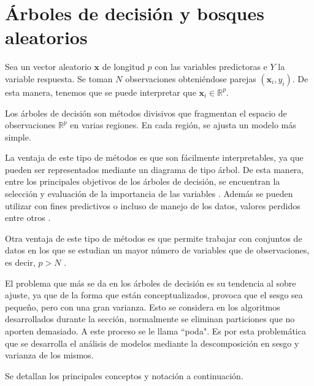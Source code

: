 \newpage
\section{ Árboles de decisión y bosques aleatorios}

\noindent Sea un vector aleatorio $\textbf{x}$ de longitud $p$ con las variables predictoras e $Y$ la variable respuesta. Se toman $N$ observaciones obteniéndose parejas $(\textbf{x}_i,y_i)$. De esta manera, tenemos que se puede interpretar que $\mathbf{x}_i\in\mathbb{R}^p$.

\noindent Los árboles de decisión son métodos divisivos que fragmentan  el espacio de observaciones $\mathbb{R}^p$ en varias regiones. En cada región, se ajusta un modelo más simple.

\noindent La ventaja de este tipo de métodos es que son fácilmente interpretables, ya que pueden ser representados mediante un diagrama de tipo árbol. De esta manera, entre los principales objetivos de los árboles de decisión, se encuentran la selección y evaluación de la importancia de las variables \cite{Brown 2004,Song 2015}. Además se pueden utilizar con fines predictivos o incluso de manejo de los datos, valores perdidos entre otros \cite{Nerini 2007}.

\noindent Otra ventaja de este tipo de métodos es que permite trabajar con conjuntos de datos en los que se estudian un mayor número de variables que de observaciones, es decir, $p > N$ \cite{Diaz 2006}. 

\noindent El problema que más se da en los árboles de decisión es su tendencia al sobre ajuste, ya que de la forma que están conceptualizados, provoca que el sesgo sea pequeño, pero con una gran varianza. Esto se considera en los algoritmos desarrollados durante la sección, normalmente se eliminan particiones que no aporten demasiado. A este proceso se le llama ``poda". Es por esta problemática que se desarrolla el análisis de modelos mediante la descomposición en sesgo y varianza de los mismos. 

\noindent Se detallan los principales conceptos y notación a continuación. 

